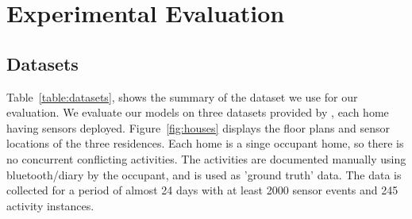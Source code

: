 \section{Experimental Evaluation}

\subsection{Datasets}


Table~\ref{table:datasets}, shows the summary of the dataset we use for our evaluation. We evaluate our models on three datasets provided by \cite{tvkasteren2010}, each home having sensors deployed. Figure~\ref{fig:houses} displays the floor plans and sensor locations of the three residences. Each home is a singe occupant home, so there is no concurrent conflicting activities. The activities are documented manually using bluetooth/diary by the occupant, and is used as 'ground truth' data. The data is collected for a period of almost 24 days with at least 2000 sensor events and 245 activity instances.

